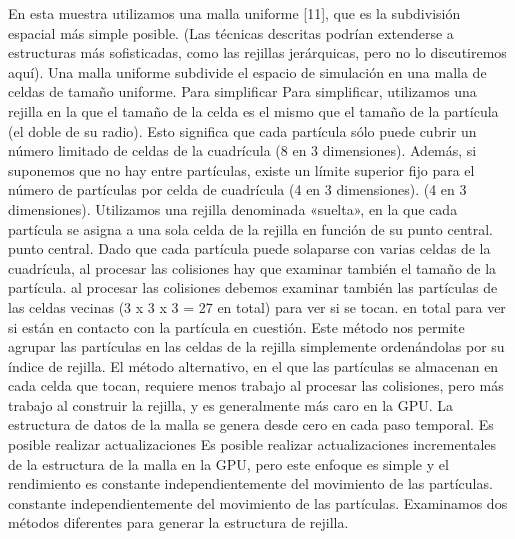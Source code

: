 En esta muestra utilizamos una malla uniforme [11], que es la subdivisión espacial más simple posible. (Las
técnicas descritas podrían extenderse a estructuras más sofisticadas, como las rejillas jerárquicas,
pero no lo discutiremos aquí).
Una malla uniforme subdivide el espacio de simulación en una malla de celdas de tamaño uniforme. Para simplificar
Para simplificar, utilizamos una rejilla en la que el tamaño de la celda es el mismo que el tamaño de la partícula (el doble de su radio). Esto significa que
cada partícula sólo puede cubrir un número limitado de celdas de la cuadrícula (8 en 3 dimensiones). Además, si suponemos que no hay
entre partículas, existe un límite superior fijo para el número de partículas por celda de cuadrícula (4 en 3 dimensiones).
(4 en 3 dimensiones).
Utilizamos una rejilla denominada «suelta», en la que cada partícula se asigna a una sola celda de la rejilla en función de su punto central.
punto central. Dado que cada partícula puede solaparse con varias celdas de la cuadrícula, al procesar las colisiones hay que examinar también el tamaño de la partícula.
al procesar las colisiones debemos examinar también las partículas de las celdas vecinas (3 x 3 x 3 = 27 en total) para ver si se tocan.
en total para ver si están en contacto con la partícula en cuestión. Este método nos permite agrupar las partículas
en las celdas de la rejilla simplemente ordenándolas por su índice de rejilla.
El método alternativo, en el que las partículas se almacenan en cada celda que tocan, requiere menos trabajo
al procesar las colisiones, pero más trabajo al construir la rejilla, y es generalmente más caro
en la GPU.
La estructura de datos de la malla se genera desde cero en cada paso temporal. Es posible realizar actualizaciones
Es posible realizar actualizaciones incrementales de la estructura de la malla en la GPU, pero este enfoque es simple y el rendimiento es constante independientemente del movimiento de las partículas.
constante independientemente del movimiento de las partículas.
Examinamos dos métodos diferentes para generar la estructura de rejilla.

